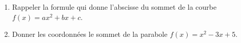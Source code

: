 
\begin{exercice}\label{exosmath-0091}

    \begin{enumerate}
        \item
            Rappeler la formule qui donne l'abscisse du sommet de la courbe \( f(x)=ax^2+bx+c\).
        \item
            Donner les coordonnées le sommet de la parabole \( f(x)=x^2-3x+5\).
    \end{enumerate}

\end{exercice}
